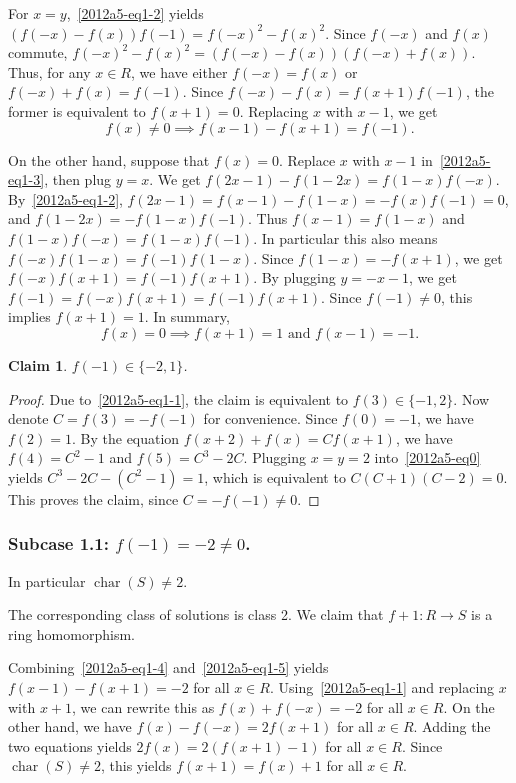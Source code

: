 \documentclass{article}
\DeclareMathOperator{\rchar}{char}
\newtheorem*{claim}{Claim}
\begin{document}
For $x = y$,~\eqref{2012a5-eq1-2} yields $(f(-x) - f(x)) f(-1) = f(-x)^2 - f(x)^2$.
Since $f(-x)$ and $f(x)$ commute, $f(-x)^2 - f(x)^2 = (f(-x) - f(x))(f(-x) + f(x))$.
Thus, for any $x \in R$, we have either $f(-x) = f(x)$ or $f(-x) + f(x) = f(-1)$.
Since $f(-x) - f(x) = f(x + 1) f(-1)$, the former is equivalent to $f(x + 1) = 0$.
Replacing $x$ with $x - 1$, we get
\[ f(x) \neq 0 \implies f(x - 1) - f(x + 1) = f(-1). \tag{1.4}\label{2012a5-eq1-4} \]

On the other hand, suppose that $f(x) = 0$.
Replace $x$ with $x - 1$ in~\eqref{2012a5-eq1-3}, then plug $y = x$.
We get $f(2x - 1) - f(1 - 2x) = f(1 - x) f(-x)$.
By~\eqref{2012a5-eq1-2}, $f(2x - 1) = f(x - 1) - f(1 - x) = -f(x) f(-1) = 0$, and $f(1 - 2x) = -f(1 - x) f(-1)$.
Thus $f(x - 1) = f(1 - x)$ and $f(1 - x) f(-x) = f(1 - x) f(-1)$.
In particular this also means $f(-x) f(1 - x) = f(-1) f(1 - x)$.
Since $f(1 - x) = -f(x + 1)$, we get $f(-x) f(x + 1) = f(-1) f(x + 1)$.
By plugging $y = -x - 1$, we get $f(-1) = f(-x) f(x + 1) = f(-1) f(x + 1)$.
Since $f(-1) \neq 0$, this implies $f(x + 1) = 1$.
In summary,
\[ f(x) = 0 \implies f(x + 1) = 1 \text{ and } f(x - 1) = -1. \tag{1.5}\label{2012a5-eq1-5} \]

\begin{claim}
$f(-1) \in \{-2, 1\}$.
\end{claim}
\begin{proof}
Due to~\eqref{2012a5-eq1-1}, the claim is equivalent to $f(3) \in \{-1, 2\}$.
Now denote $C = f(3) = -f(-1)$ for convenience.
Since $f(0) = -1$, we have $f(2) = 1$.
By the equation $f(x + 2) + f(x) = C f(x + 1)$, we have $f(4) = C^2 - 1$ and $f(5) = C^3 - 2C$.
Plugging $x = y = 2$ into~\eqref{2012a5-eq0} yields $C^3 - 2C - (C^2 - 1) = 1$, which is equivalent to $C(C + 1)(C - 2) = 0$.
This proves the claim, since $C = -f(-1) \neq 0$.
\end{proof}


\subsubsection*{Subcase 1.1: $f(-1) = -2 \neq 0$.}

In particular $\rchar(S) \neq 2$.

The corresponding class of solutions is class 2.
We claim that $f + 1 : R \to S$ is a ring homomorphism.
    
Combining~\eqref{2012a5-eq1-4} and~\eqref{2012a5-eq1-5} yields $f(x - 1) - f(x + 1) = -2$ for all $x \in R$.
Using~\eqref{2012a5-eq1-1} and replacing $x$ with $x + 1$, we can rewrite this as $f(x) + f(-x) = -2$ for all $x \in R$.
On the other hand, we have $f(x) - f(-x) = 2 f(x + 1)$ for all $x \in R$.
Adding the two equations yields $2 f(x) = 2 (f(x + 1) - 1)$ for all $x \in R$.
Since $\rchar(S) \neq 2$, this yields $f(x + 1) = f(x) + 1$ for all $x \in R$.
\end{document}
